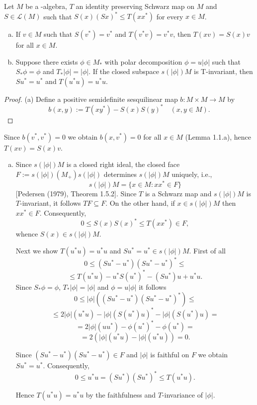 \begin{lemma}\label{lem:d3-1.2}
Let $M$ be a \WA-algebra, $T$ an identity preserving Schwarz map on $M$ and $S\in\mathcal{L}(M)$ such that $S(x)(Sx)^* \leq T(xx^*)$ for every $x\in M$.

\begin{enumerate}[(a)]
\item If $v\in M$ such that $S(v^*) = v^*$ and $T(v^*v) = v^*v$, then $T(xv) = S(x)v$ for all $x\in M$.
\item Suppose there exists $\phi\in M_{*}$ with polar decomposition $\phi = u|\phi|$ such that $S_{*}\phi = \phi$ and $T_{*}|\phi| = |\phi|$.
If the closed subspace $s(|\phi|)M$ is T-invariant, then $Su^* = u^*$ and $T(u^*u) = u^*u$.
\end{enumerate}
\end{lemma}
\begin{proof}
(a) Define a positive semidefinite sesquilinear map $b: M\times M \to M$ by
\[
b(x,y) := T(xy^*) - S(x)S(y)^* \quad (x,y\in M).
\]
\end{proof}

Since $b(v^{*},v^{*}) = 0$ we obtain $b(x,v^{*}) = 0$ for all $x \in M$ (Lemma 1.1.a), hence $T(xv) = S(x)v$.

\begin{enumerate}[(a)]
\item 
Since $s(|\phi|)M$ is a closed right ideal, the closed face $F := s(|\phi|)(M_{+})s(|\phi|)$ determines $s(|\phi|)M$ uniquely, i.e.,
\[
s(|\phi|)M = \{x \in M : xx^{*} \in F\}
\]
[Pedersen (1979), Theorem 1.5.2].
Since $T$ is a Schwarz map and $s(|\phi|)M$ is $T$-invariant, it follows $TF \subseteq F$.
On the other hand, if $x \in s(|\phi|)M$ then $xx^{*} \in F$.
Consequently,
\[
0 \leq S(x)S(x)^{*} \leq T(xx^{*}) \in F,
\]
whence $S(x) \in s(|\phi|)M$.

Next we show $T(u^{*}u) = u^{*}u$ and $Su^{*} = u^{*} \in s(|\phi|)M$.
First of all
\[
0 \leq (Su^{*} - u^{*})(Su^{*} - u^{*})^{*} \leq
\]
\[
\leq T(u^{*}u) - u^{*}S(u^{*})^{*} - (Su^{*})u + u^{*}u.
\]
Since $S_{*}\phi = \phi$, $T_{*}|\phi| = |\phi|$ and $\phi = u|\phi|$ it follows
\[
0 \leq |\phi|((Su^{*} - u^{*})(Su^{*} - u^{*})^{*}) \leq
\]
\[
\leq 2|\phi|(u^{*}u) - |\phi|(S(u^{*})u)^{*} - |\phi|(S(u^{*})u) =
\]
\[
= 2|\phi|(uu^{*}) - \phi(u^{*})^{*} - \phi(u^{*}) =
\]
\[
= 2(|\phi|(u^{*}u) - |\phi|(u^{*}u)) = 0.
\]

Since $(Su^{*} - u^{*})(Su^{*} - u^{*}) \in F$ and $|\phi|$ is faithful on $F$ we obtain $Su^{*} = u^{*}$.
Consequently,
\[
0 \leq u^{*}u = (Su^{*})(Su^{*})^{*} \leq T(u^{*}u).
\]

Hence $T(u^{*}u) = u^{*}u$ by the faithfulness and $T$-invariance of $|\phi|$.
\end{enumerate}


